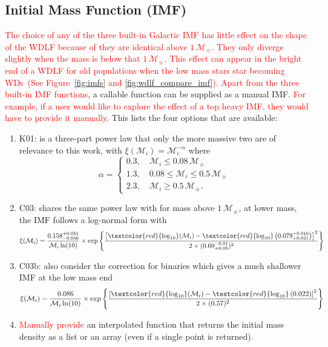 \documentclass[fleqn,usenatbib]{rasti}
\newcommand{\msun}{\mathcal{M}_{\sun}}
\begin{document}
\subsection{Initial Mass Function (IMF)}
\textcolor{red}{The choice of any of the three built-in Galactic IMF has little
effect on the shape of the WDLF because of they are identical above $1\,\msun$.
They only diverge slightly when the mass is below that $1\,\msun$. This effect
can appear in the bright end of a WDLF for old populations when the low mass
stars star becoming WDs~(See Figure~\ref{fig:imfs} and
\ref{fig:wdlf_compare_imf}). Apart from the three built-in IMF functions}, a
callable function can be supplied as a manual IMF. \textcolor{red}{For
example, if a user would like to explore the effect of a top heavy IMF, they
would have to provide it manually}. This lists the four options that are
available:

\begin{enumerate}
    \item K01: \citet{2001MNRAS.322..231K} is a three-part power law that only the
    more massive two are of relevance to this work, with
    $\xi(\mathcal{M}_i) = \mathcal{M}_i^{-\alpha}$ where
    \begin{equation}
        \alpha =
        \begin{cases}
            0.3, \quad \mathcal{M}_i \leq 0.08\,\msun\\
            1.3, \quad 0.08 \leq \mathcal{M}_i \leq 0.5\,\msun\\
            2.3, \quad \mathcal{M}_i \geq 0.5\,\msun.
        \end{cases}
    \end{equation}
    \item C03: \citet{2003PASP..115..763C} shares the same power law with
    \citet{2001MNRAS.322..231K} for mass above $1\,\msun$, at lower mass,
    the IMF follows a log-normal form with
    \begin{equation}
        \xi(\mathcal{M}_i) = \dfrac{0.158^{+0.051}_{-0.046}}{\mathcal{M}_i \ln(10)} \times
            \exp{\left\{\dfrac{\left[\textcolor{red}{\log_{10}}(\mathcal{M}_i) - \textcolor{red}{\log_{10}}\left(0.079^{-0.016}_{+0.021}\right)\right]^2}{2 \times (0.69^{-0.01}_{+0.05})^2}\right\}}
    \end{equation}
    \item C03b: \citet[][including binary]{2003PASP..115..763C} also consider the correction for binaries which gives a much shallower IMF at the low mass end
    \begin{equation}
        \xi(\mathcal{M}_i) = \dfrac{0.086}{\mathcal{M}_i \ln(10)} \times
            \exp{\left\{\dfrac{\left[\textcolor{red}{\log_{10}}(\mathcal{M}_i) - \textcolor{red}{\log_{10}}\left(0.022\right)\right]^2}{2 \times (0.57)^2}\right\}}
    \end{equation}
    \item \textcolor{red}{Manually provide} an interpolated function that returns the initial mass density as a list or an array (even if a single point is returned).
\end{enumerate}
\end{document}
